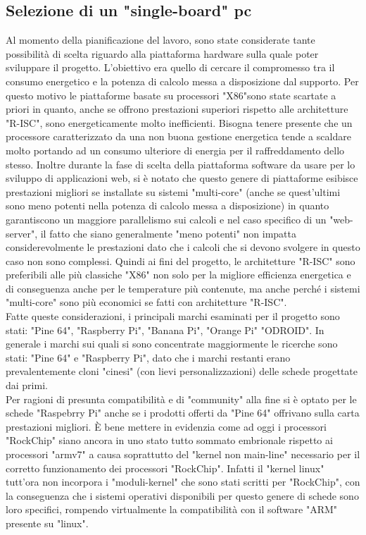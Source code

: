 \subsection{Selezione di un "single-board" pc}
\raggedright
Al momento della pianificazione del lavoro, sono state considerate tante possibilità di scelta riguardo alla piattaforma hardware sulla quale poter sviluppare il progetto. L'obiettivo era quello di cercare il compromesso tra il consumo energetico e la potenza di calcolo messa a disposizione dal supporto. Per questo motivo le piattaforme basate su processori "X86"sono state scartate a priori in quanto, anche se offrono prestazioni superiori rispetto alle architetture "R-ISC", sono energeticamente molto inefficienti. Bisogna tenere presente che un processore caratterizzato da una non buona gestione energetica tende a scaldare molto portando ad un consumo ulteriore di energia per il raffreddamento dello stesso.  Inoltre durante la fase di scelta della piattaforma software da usare per lo sviluppo di applicazioni web, si è notato che questo genere di piattaforme esibisce prestazioni migliori se installate su sistemi "multi-core" (anche se quest'ultimi sono meno potenti nella potenza di calcolo messa a disposizione) in quanto garantiscono un maggiore parallelismo sui calcoli e nel caso specifico di un "web-server", il fatto che siano generalmente "meno potenti" non impatta considerevolmente le prestazioni dato che i calcoli che si devono svolgere in questo caso non sono complessi. Quindi ai fini del progetto, le architetture "R-ISC" sono preferibili alle più classiche "X86" non solo per la migliore efficienza energetica e di conseguenza anche per le temperature più contenute, ma anche perché i sistemi "multi-core" sono più economici se fatti con architetture "R-ISC".\\
Fatte queste considerazioni, i principali marchi esaminati per il progetto sono stati: "Pine 64", "Raspberry Pi", "Banana Pi", "Orange Pi" "ODROID". In generale i marchi sui quali si sono concentrate maggiormente le ricerche sono stati: "Pine 64" e "Raspberry Pi", dato che i marchi restanti erano prevalentemente cloni "cinesi" (con lievi personalizzazioni) delle schede progettate dai primi.\\
Per ragioni di presunta compatibilità e di "community" alla fine si è optato per le schede "Raspebrry Pi" anche se i prodotti offerti da "Pine 64" offrivano sulla carta prestazioni migliori. È bene mettere in evidenzia come ad oggi i processori "RockChip" siano ancora in uno stato tutto sommato embrionale rispetto ai processori "armv7"  a causa soprattutto del "kernel non main-line" necessario per il corretto funzionamento dei processori "RockChip". Infatti il "kernel linux" tutt'ora non incorpora i "moduli-kernel" che sono stati scritti per "RockChip", con la conseguenza che i sistemi operativi disponibili per questo genere di schede sono loro specifici, rompendo virtualmente la compatibilità con il software "ARM" presente su "linux".\\
